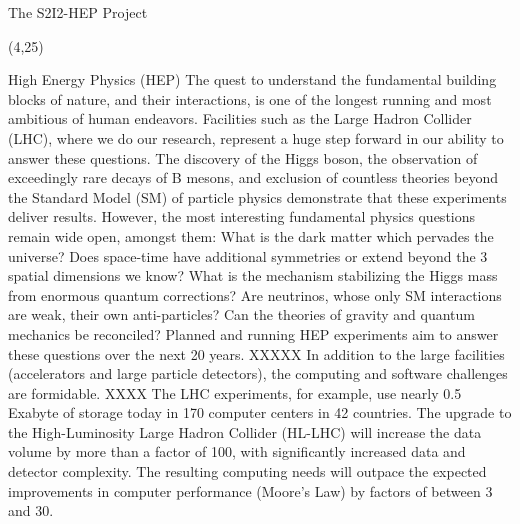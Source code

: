 \documentclass[final]{beamer}
\begin{document}
\begin{frame}{}
\begin{textblock}{78.0}
\begin{block}{The S2I2-HEP Project}
\end{block}
\end{textblock}

\begin{textblock}{38.0}(4,25)
\begin{block}{High Energy Physics (HEP)}
The quest to understand the fundamental building blocks of nature,
and their interactions, is one of the longest running and most
ambitious of human endeavors. Facilities such as the Large Hadron
Collider (LHC), where we do our research, represent a huge step
forward in our ability to answer these questions. The discovery of
the Higgs boson, the observation of exceedingly rare decays of B
mesons, and exclusion of countless theories beyond the Standard
Model (SM) of particle physics demonstrate that these experiments
deliver results. However, the most interesting fundamental physics
questions remain wide open, amongst them: What is the dark matter
which pervades the universe? Does space-time have additional
symmetries or extend beyond the 3 spatial dimensions we know? What
is the mechanism stabilizing the Higgs mass from enormous quantum
corrections? Are neutrinos, whose only SM interactions are weak,
their own anti-particles? Can the theories of gravity and quantum
mechanics be reconciled? Planned and running HEP experiments 
aim to answer these questions over the next 20 years. 
XXXXX In addition to the large facilities (accelerators and large particle
detectors), the computing and software challenges 
are formidable. XXXX
The LHC experiments, for example, use nearly 0.5 Exabyte of
storage today in 170 computer centers in 42 countries. 
The upgrade to the High-Luminosity Large Hadron Collider (HL-LHC) will
increase the data volume
by more than a factor of 100, with significantly increased data and detector complexity. The resulting computing needs will outpace the expected improvements in computer performance (Moore's Law) by factors of between 3 and 30. 


\end{block}
\end{textblock}
\end{frame}
\end{document}
